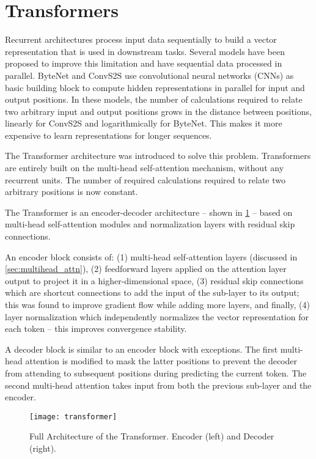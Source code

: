 \section{Transformers}
\label{sec:transformers}

Recurrent architectures process input data sequentially to build a vector representation that is used in downstream tasks. Several models have been proposed to improve this limitation and have sequential data processed in parallel. ByteNet \citep{kalchbrenner2016neural} and ConvS2S \citep{gehring2017convolutional} use convolutional neural networks (CNNs) as basic building block to compute hidden representations in parallel for input and output positions. In these models, the number of calculations required to relate two arbitrary input and output positions grows in the distance between positions, linearly for ConvS2S and logarithmically for ByteNet. This makes it more expensive to learn representations for longer sequences.

The Transformer architecture was introduced \citep{vaswani2017attention} to solve this problem. Transformers are entirely built on the multi-head self-attention mechanism, without any recurrent units. The number of required calculations required to relate two arbitrary positions is now constant.

The Transformer is an encoder-decoder architecture -- shown in \cref{fig:transformer} -- based on multi-head self-attention modules and normalization layers with residual skip connections.

An encoder block consists of: (1) multi-head self-attention layers (discussed in \cref{sec:multihead_attn}), (2) feedforward layers applied on the attention layer output to project it in a higher-dimensional space, (3) residual skip connections which are shortcut connections to add the input of the sub-layer to its output; this was found to improve gradient flow while adding more layers, and finally, (4) layer normalization \citep{ba2016layer} which independently normalizes the vector representation for each token -- this improves convergence stability.

A decoder block is similar to an encoder block with exceptions. The first multi-head attention is modified to mask the latter positions to prevent the decoder from attending to subsequent positions during predicting the current token. The second multi-head attention takes input from both the previous sub-layer and the encoder.

\begin{figure}[ht]
\centering
\texttt{[image: transformer]}
\caption{Full Architecture of the Transformer. Encoder (left) and Decoder (right). \protect\footnotemark}
\label{fig:transformer}
\end{figure}

